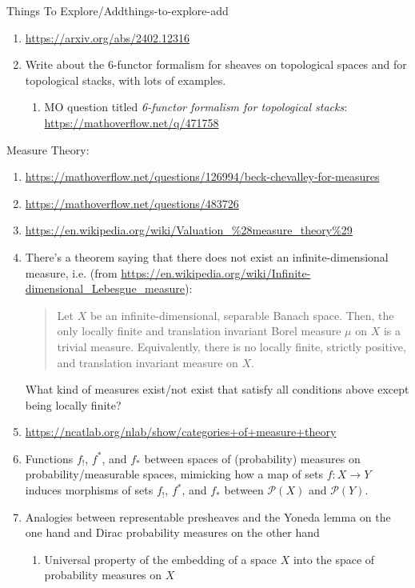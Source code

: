 \begin{remark}{Things To Explore/Add}{things-to-explore-add}
\begin{enumerate}
        \item \url{https://arxiv.org/abs/2402.12316}
        \item Write about the 6-functor formalism for sheaves on topological spaces and for topological stacks, with lots of examples.
            \begin{enumerate}
                \item MO question titled \emph{6-functor formalism for topological stacks}: \url{https://mathoverflow.net/q/471758}
            \end{enumerate}
    \end{enumerate}
    Measure Theory:
    \begin{enumerate}
        \item \url{https://mathoverflow.net/questions/126994/beck-chevalley-for-measures}
        \item \url{https://mathoverflow.net/questions/483726}
        \item \url{https://en.wikipedia.org/wiki/Valuation_\%28measure_theory\%29}
        \item There's a theorem saying that there does not exist an infinite-dimensional  measure, i.e. (from \url{https://en.wikipedia.org/wiki/Infinite-dimensional_Lebesgue_measure}):
            \begin{quote}
                Let $X$ be an infinite-dimensional, separable Banach space. Then, the only locally finite and translation invariant Borel measure $\mu$ on $X$ is a trivial measure. Equivalently, there is no locally finite, strictly positive, and translation invariant measure on $X$.
            \end{quote}
            What kind of measures exist/not exist that satisfy all conditions above except being locally finite?
        \item \url{https://ncatlab.org/nlab/show/categories+of+measure+theory}
        \item Functions $f_{!}$, $f^{*}$, and $f_{*}$ between spaces of (probability) measures on probability/measurable spaces, mimicking how a map of sets $f\colon X\to Y$ induces morphisms of sets $f_{!}$, $f^{*}$, and $f_{*}$ between $\mathcal{P}(X)$ and $\mathcal{P}(Y)$.
        \item Analogies between representable presheaves and the Yoneda lemma on the one hand and Dirac probability measures on the other hand
            \begin{enumerate}
                \item Universal property of the embedding of a space $X$ into the space of probability measures on $X$

\end{enumerate}
\end{enumerate}
\end{remark}
